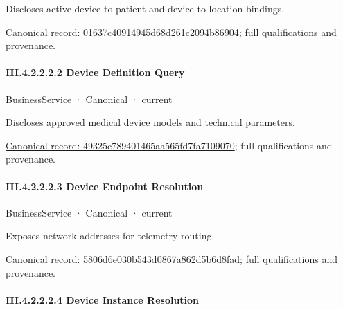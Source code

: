 Discloses active device-to-patient and device-to-location bindings.


{\footnotesize \href{../../../../continuum/business/business-service/01637c40914945d68d261c2094b86904.md}{Canonical record: 01637c40914945d68d261c2094b86904}; full qualifications and provenance.}\par
\paragraph*{III.4.2.2.2.2 Device Definition Query}
\label{navigation:III.4.2.2.2.2}

\label{element:49325c789401465aa565fd7fa7109070}
{\small BusinessService · Canonical · current}\par

Discloses approved medical device models and technical parameters.


{\footnotesize \href{../../../../continuum/business/business-service/49325c789401465aa565fd7fa7109070.md}{Canonical record: 49325c789401465aa565fd7fa7109070}; full qualifications and provenance.}\par
\paragraph*{III.4.2.2.2.3 Device Endpoint Resolution}
\label{navigation:III.4.2.2.2.3}

\label{element:5806d6e030b543d0867a862d5b6d8fad}
{\small BusinessService · Canonical · current}\par

Exposes network addresses for telemetry routing.


{\footnotesize \href{../../../../continuum/business/business-service/5806d6e030b543d0867a862d5b6d8fad.md}{Canonical record: 5806d6e030b543d0867a862d5b6d8fad}; full qualifications and provenance.}\par
\paragraph*{III.4.2.2.2.4 Device Instance Resolution}
\label{navigation:III.4.2.2.2.4}

